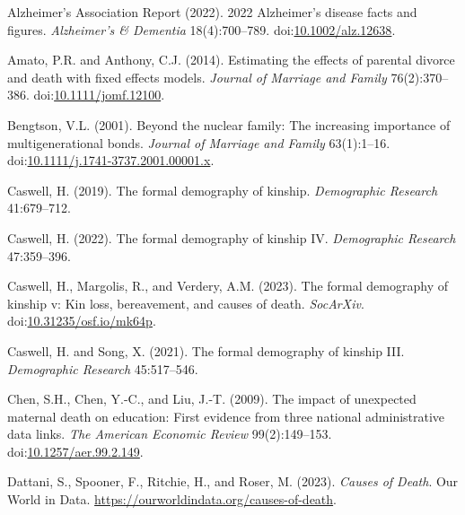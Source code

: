 \documentclass[
  11pt,
  letterpaper,
]{article}
\newlength{\cslhangindent}
\newlength{\cslentryspacingunit} %
\newenvironment{CSLReferences}[2] %
 {%
  \setlength{\parindent}{0pt}
  \ifodd #1
  \let\oldpar\par
  \def\par{\hangindent=\cslhangindent\oldpar}
  \fi
  \setlength{\parskip}{#2\cslentryspacingunit}
 }%
 {}
\begin{document}
\hypertarget{refs}{}
\begin{CSLReferences}{1}{0}
\leavevmode{}%
Alzheimer's Association Report (2022). 2022 {A}lzheimer's disease facts and figures. \emph{{A}lzheimer's \& Dementia} 18(4):700--789. doi:\href{https://doi.org/10.1002/alz.12638}{10.1002/alz.12638}.

\leavevmode{}%
Amato, P.R. and Anthony, C.J. (2014). Estimating the effects of parental divorce and death with fixed effects models. \emph{Journal of Marriage and Family} 76(2):370--386. doi:\href{https://doi.org/10.1111/jomf.12100}{10.1111/jomf.12100}.

\leavevmode{}%
Bengtson, V.L. (2001). Beyond the nuclear family: The increasing importance of multigenerational bonds. \emph{Journal of Marriage and Family} 63(1):1--16. doi:\href{https://doi.org/10.1111/j.1741-3737.2001.00001.x}{10.1111/j.1741-3737.2001.00001.x}.

\leavevmode{}%
Caswell, H. (2019). The formal demography of kinship. \emph{Demographic Research} 41:679--712.

\leavevmode{}%
Caswell, H. (2022). The formal demography of kinship IV. \emph{Demographic Research} 47:359--396.

\leavevmode{}%
Caswell, H., Margolis, R., and Verdery, A.M. (2023). The formal demography of kinship v: Kin loss, bereavement, and causes of death. \emph{SocArXiv}. doi:\href{https://doi.org/10.31235/osf.io/mk64p}{10.31235/osf.io/mk64p}.

\leavevmode{}%
Caswell, H. and Song, X. (2021). The formal demography of kinship III. \emph{Demographic Research} 45:517--546.

\leavevmode{}%
Chen, S.H., Chen, Y.-C., and Liu, J.-T. (2009). The impact of unexpected maternal death on education: First evidence from three national administrative data links. \emph{The American Economic Review} 99(2):149--153. doi:\href{https://doi.org/10.1257/aer.99.2.149}{10.1257/aer.99.2.149}.

\leavevmode{}%
Dattani, S., Spooner, F., Ritchie, H., and Roser, M. (2023). \emph{Causes of Death}. Our World in Data. \url{https://ourworldindata.org/causes-of-death}.


\end{CSLReferences}
\end{document}
